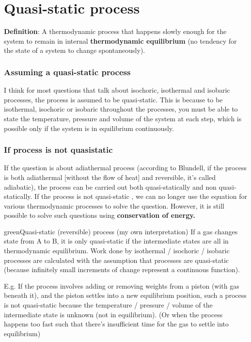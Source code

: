 \section{Quasi-static process}
\textbf{Definition}: A thermodynamic process that happens slowly enough for the system to remain in internal \textbf{thermodynamic equilibrium} (no tendency for the state of a system to change spontaneously).
\subsubsection{Assuming a quasi-static process}
I think for most questions that talk about isochoric, isothermal and isobaric processes, the process is assumed to be quasi-static. This is because to be isothermal, isochoric or isobaric throughout the processes, you must be able to state the temperature, pressure and volume of the system at each step, which is possible only if the system is in equilibrium continuously.

\subsubsection{If process is not quasistatic}

If the question is about adiathermal process (according to Blundell, if the process is both adiathermal [without the flow of heat] and reversible, it's called adiabatic), the process can be carried out both quasi-statically and non quasi-statically. If the process is not quasi-static , we can no longer use the equation for various thermodynamic processes to solve the question. However, it is still possible to solve such questions using \textbf{conservation of energy.}

\begin{mybox}{green}{Quasi-static (reversible) process (my own interpretation)}
    If a gas changes state from A to B, it is only quasi-static if the intermediate states are all in thermodynamic equilibrium. Work done by isothermal / isochoric / isobaric processes are calculated with the assumption that processes are quasi-static (because infinitely small increments of change represent a continuous function).

    \begin{flushleft}
        E.g. If the process involves adding or removing weights from a piston (with gas beneath it), and the piston settles into a new equilibrium position, such a process is not quasi-static because the temperature / pressure / volume of the intermediate state is unknown (not in equilibrium). (Or when the process happens too fast such that there's insufficient time for the gas to settle into equilibrium)
    \end{flushleft}

\end{mybox}

